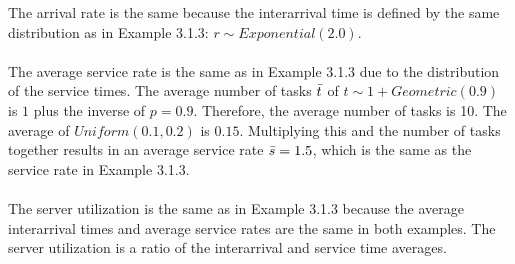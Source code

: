 \noindent The arrival rate is the same because the interarrival time is defined by the same distribution as in Example 3.1.3: $r \sim Exponential(2.0)$.\\\\

\noindent The average service rate is the same as in Example 3.1.3 due to the distribution of the service times. The average number of tasks $\Bar{t}$ of $t \sim 1+ Geometric(0.9)$ is $1$ plus the inverse of $p=0.9$. Therefore, the average number of tasks is 10. The average of $Uniform(0.1, 0.2)$ is $0.15$. Multiplying this and the number of tasks together results in an average service rate $\Bar{s} = 1.5$, which is the same as the service rate in Example 3.1.3.\\\\

\noindent The server utilization is the same as in Example 3.1.3 because the average interarrival times and average service rates are the same in both examples. The server utilization is a ratio of the interarrival and service time averages.

\newpage
